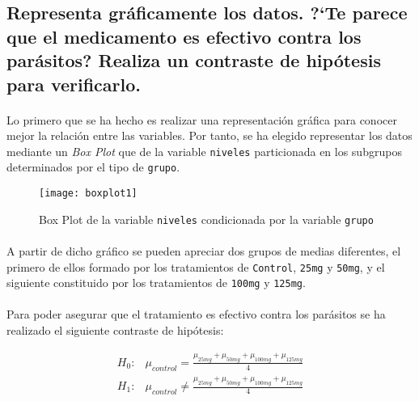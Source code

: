 \documentclass{article}
\begin{document}
    \subsection{Representa gráficamente los datos. ?`Te parece que el medicamento es efectivo contra los parásitos? Realiza un contraste de hipótesis para verificarlo.}

      \paragraph{}
      Lo primero que se ha hecho es realizar una representación gráfica para conocer mejor la relación entre las variables. Por tanto, se ha elegido representar los datos mediante un \emph{Box Plot} que de la variable \texttt{niveles} particionada en los subgrupos determinados por el tipo de \texttt{grupo}.

      \begin{figure}[H]
        \centering
        \texttt{[image: boxplot1]}
        \caption{Box Plot de la variable \texttt{niveles} condicionada por la variable \texttt{grupo}}
        \label{fig:figura_1}
      \end{figure}
      \paragraph{}

      \paragraph{}
      A partir de dicho gráfico se pueden apreciar dos grupos de medias diferentes, el primero de ellos formado por los tratamientos de \texttt{Control}, \texttt{25mg} y \texttt{50mg}, y el siguiente constituido por los tratamientos de \texttt{100mg} y \texttt{125mg}.

      \paragraph{}
      Para poder asegurar que el tratamiento es efectivo contra los parásitos se ha realizado el siguiente contraste de hipótesis:

      \begin{align}
        H_0:& \mu_{control} = \frac{\mu_{25mg} + \mu_{50mg} +\mu_{100mg} +\mu_{125mg}}{4} \\
        H_1:& \mu_{control} \neq \frac{\mu_{25mg} + \mu_{50mg} +\mu_{100mg} +\mu_{125mg}}{4}
      \end{align}
\end{document}
